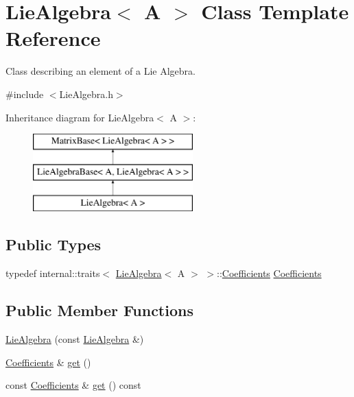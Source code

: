 \hypertarget{class_lie_algebra}{}\section{Lie\+Algebra$<$ A $>$ Class Template Reference}
\label{class_lie_algebra}


Class describing an element of a Lie Algebra.  




{\ttfamily \#include $<$Lie\+Algebra.\+h$>$}

Inheritance diagram for Lie\+Algebra$<$ A $>$\+:\begin{figure}[H]
\begin{center}
\leavevmode
\includegraphics[height=3.000000cm]{class_lie_algebra}
\end{center}
\end{figure}
\subsection*{Public Types}
\begin{DoxyCompactItemize}
\item 
typedef internal\+::traits$<$ \hyperlink{class_lie_algebra}{Lie\+Algebra}$<$ A $>$ $>$\+::\hyperlink{class_lie_algebra_a366fde92cd31cf93be87fe82952c8ebb}{Coefficients} \hyperlink{class_lie_algebra_a366fde92cd31cf93be87fe82952c8ebb}{Coefficients}
\end{DoxyCompactItemize}
\subsection*{Public Member Functions}
\begin{DoxyCompactItemize}
\item 
\hyperlink{class_lie_algebra_ac04b1456c7a78d070a6672b8f7989197}{Lie\+Algebra} (const \hyperlink{class_lie_algebra}{Lie\+Algebra} \&)
\item 
\hyperlink{class_lie_algebra_a366fde92cd31cf93be87fe82952c8ebb}{Coefficients} \& \hyperlink{class_lie_algebra_a5d64201eddce6b2124890c26a684fc8f}{get} ()
\item 
const \hyperlink{class_lie_algebra_a366fde92cd31cf93be87fe82952c8ebb}{Coefficients} \& \hyperlink{class_lie_algebra_aa90c4e53102c2376bf24af1cb4f0112c}{get} () const
\end{DoxyCompactItemize}
